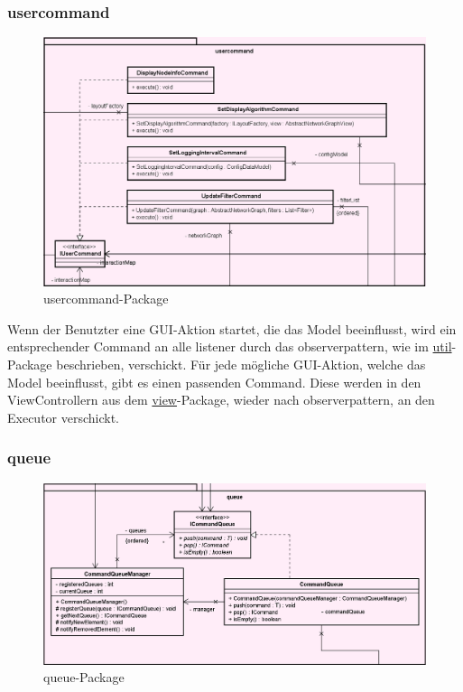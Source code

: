       \subsubsection{usercommand}
      \label{subsubsec:usercommand}
      
      \begin{figure}[H]
        \centering
        \includegraphics[width=\textwidth]{../diagramimages/usercommand.png}
        \caption{usercommand-Package}
      \end{figure}
      
      \medskip
      Wenn der Benutzter eine GUI-Aktion startet, die das Model beeinflusst,
      wird ein entsprechender Command an alle \gls{listener} durch das \gls{observerpattern}, wie im
      \hyperref[subsec:util]{util}-Package beschrieben, verschickt. Für jede mögliche
      GUI-Aktion, welche das Model beeinflusst, gibt es einen passenden Command.
      Diese werden in den ViewControllern aus dem \hyperref[subsec:view]{view}-Package, wieder nach \gls{observerpattern},
      an den Executor verschickt.

      \subsubsection{queue}
      \label{subsubsec:queue}
      
      \begin{figure}[H]
        \centering
        \includegraphics[width=\textwidth]{../diagramimages/queue.png}
        \caption{queue-Package}
      \end{figure}
      
